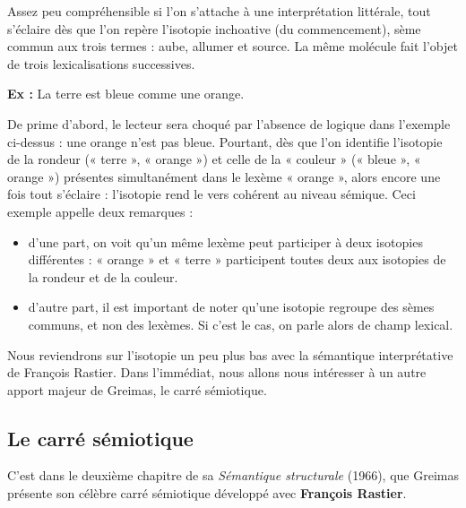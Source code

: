 Assez peu compréhensible si l’on s’attache à une interprétation littérale, tout s’éclaire dès que l’on repère l’isotopie inchoative (du commencement), sème commun aux trois termes : aube, allumer et source. La même molécule fait l’objet de trois lexicalisations successives.

\noindent\textbf{Ex :} La terre est bleue comme une orange.

De prime d’abord, le lecteur sera choqué par l’absence de logique dans l’exemple ci-dessus : une orange n’est pas bleue. Pourtant, dès que l’on identifie l’isotopie de la rondeur (« terre », « orange ») et celle de la « couleur » (« bleue », « orange ») présentes simultanément dans le lexème « orange », alors encore une fois tout s’éclaire : l’isotopie rend le vers cohérent au niveau sémique. Ceci exemple appelle deux remarques :
\begin{itemize}
\item d’une part, on voit qu’un même lexème peut participer à deux isotopies différentes : « orange » et « terre » participent toutes deux aux isotopies de la rondeur et de la couleur.
\item d’autre part, il est important de noter qu’une isotopie regroupe des sèmes communs, et non des lexèmes. Si c’est le cas, on parle alors de champ lexical.
\end{itemize}
Nous reviendrons sur l’isotopie un peu plus bas avec la sémantique interprétative de François Rastier. Dans l’immédiat, nous allons nous intéresser à un autre apport majeur de Greimas, le carré sémiotique.

\subsection{Le carré sémiotique}
C’est dans le deuxième chapitre de sa \textit{Sémantique structurale} (1966), que Greimas présente son célèbre carré sémiotique développé avec \textbf{François Rastier}.

